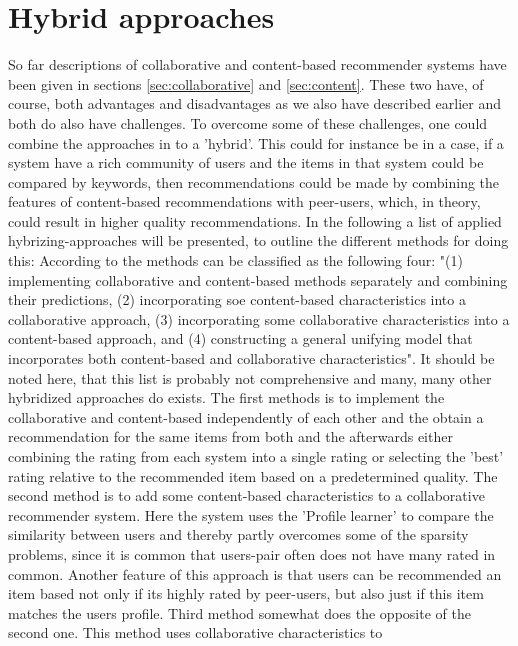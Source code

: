 \section{Hybrid approaches}
So far descriptions of collaborative and content-based recommender systems have been given in sections \ref{sec:collaborative} and \ref{sec:content}. These two have, of course, both advantages and disadvantages as we also have described earlier and both do also have challenges. To overcome some of these challenges, one could combine the approaches in to a 'hybrid'. This could for instance be in a case, if a system have a rich community of users and the items in that system could be compared by keywords, then recommendations could be made by combining the features of content-based recommendations with peer-users, which, in theory, could result in higher quality recommendations.
In the following a list of applied hybrizing-approaches will be presented, to outline the different methods for doing this:
According to \citep[p. 20]{TowardsTheNextGenerationOfRs} the methods can be classified as the following four: "(1) implementing collaborative and content-based methods separately and combining their predictions, (2) incorporating soe content-based characteristics into a collaborative approach, (3) incorporating some collaborative characteristics into a content-based approach, and (4) constructing a general unifying model that incorporates both content-based and collaborative characteristics". It should be noted here, that this list is probably not comprehensive and many, many other hybridized approaches do exists. 
The first methods is to implement the collaborative and content-based independently of each other and the obtain a recommendation for the same items from both and the afterwards either combining the rating from each system into a single rating or selecting the 'best' rating relative to the recommended item based on a predetermined quality. 
The second method is to add some content-based characteristics to a collaborative recommender system. Here the system uses the 'Profile learner' to compare the similarity between users and thereby partly overcomes some of the sparsity problems, since it is common that users-pair often does not have many rated in common. Another feature of this approach is that users can be recommended an item based not only if its highly rated by peer-users, but also just if this item matches the users profile. 
Third method somewhat does the opposite of the second one. This method uses collaborative characteristics to  
